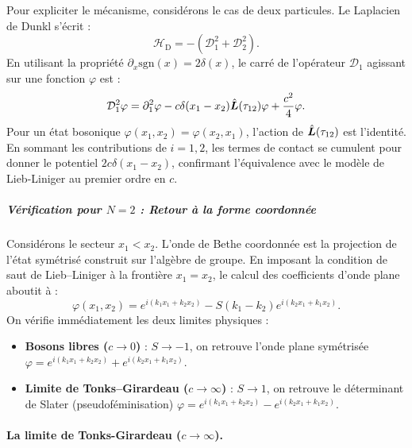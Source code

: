 Pour expliciter le mécanisme, considérons le cas de deux particules. Le Laplacien de Dunkl s'écrit :
\begin{equation}
    \mathcal{H}_{\text{D}} = -(\mathcal{D}_1^2 + \mathcal{D}_2^2).
\end{equation}
En utilisant la propriété $\partial_x \text{sgn}(x) = 2\delta(x)$, le carré de l'opérateur $\mathcal{D}_1$ agissant sur une fonction $\varphi$ est :
\begin{equation}
    \mathcal{D}_1^2 \varphi = \partial_1^2 \varphi - c\delta(x_1-x_2)\hat{\bm{L}}(\tau_{12})\varphi + \frac{c^2}{4}\varphi.
\end{equation}
Pour un état bosonique $\varphi(x_1, x_2) = \varphi(x_2, x_1)$, l'action de $\hat{\bm{L}}(\tau_{12})$ est l'identité. En sommant les contributions de $i=1,2$, les termes de contact se cumulent pour donner le potentiel $2c\delta(x_1-x_2)$, confirmant l'équivalence avec le modèle de Lieb-Liniger au premier ordre en $c$.

\subparagraph{Vérification pour $N=2$ : Retour à la forme coordonnée}

Considérons le secteur $x_1 < x_2$. L'onde de Bethe coordonnée est la projection de l'état symétrisé construit sur l'algèbre de groupe. En imposant la condition de saut de Lieb--Liniger à la frontière $x_1 = x_2$, le calcul des coefficients d'onde plane aboutit à :
\begin{equation}
    \varphi(x_1, x_2) = e^{i(k_1x_1 + k_2x_2)} - S(k_1 - k_2) e^{i(k_2x_1 + k_1x_2)}.
\end{equation}
On vérifie immédiatement les deux limites physiques :
\begin{itemize}[label = $\bullet$]
    \item \textbf{Bosons libres ($c \to 0$)} : $S \to -1$, on retrouve l'onde plane symétrisée $\varphi = e^{i(k_1x_1+k_2x_2)} + e^{i(k_2x_1+k_1x_2)}$.
    \item \textbf{Limite de Tonks--Girardeau ($c \to \infty$)} : $S \to 1$, on retrouve le déterminant de Slater (pseudoféminisation) $\varphi = e^{i(k_1x_1+k_2x_2)} - e^{i(k_2x_1+k_1x_2)}$.
\end{itemize}

\paragraph{La limite de Tonks-Girardeau ($c \to \infty$).}

